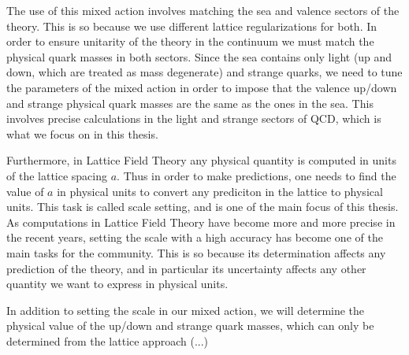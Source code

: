 The use of this mixed action involves matching the sea and valence sectors of the theory. This is so because we use different lattice regularizations for both. In order to ensure unitarity of the theory in the continuum we must match the physical quark masses in both sectors. Since the sea contains only light (up and down, which are treated as mass degenerate) and strange quarks, we need to tune the parameters of the mixed action in order to impose that the valence up/down and strange physical quark masses are the same as the ones in the sea. This involves precise calculations in the light and strange sectors of QCD, which is what we focus on in this thesis.

Furthermore, in Lattice Field Theory any physical quantity is computed in units of the lattice spacing $a$. Thus in order to make predictions, one needs to find the value of $a$ in physical units to convert any prediciton in the lattice to physical units. This task is called scale setting, and is one of the main focus of this thesis. As computations in Lattice Field Theory have become more and more precise in the recent years, setting the scale with a high accuracy has become one of the main tasks for the community. This is so because its determination affects any prediction of the theory, and in particular its uncertainty affects any other quantity we want to express in physical units.

In addition to setting the scale in our mixed action, we will determine the physical value of the up/down and strange quark masses, which can only be determined from the lattice approach (...)

